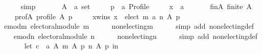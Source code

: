 \begin{isabellebody}
\ \ \ \ \isamarkupfalse%
\ simp\isanewline
{}\isamarkupfalse%
\isanewline
\ \ \isamarkupfalse%
\isanewline
\ \ \ \ A\ {\isacharcolon}{\kern0pt}{\isacharcolon}{\kern0pt}\ {\isachardoublequoteopen}{\isacharprime}{\kern0pt}a\ set{\isachardoublequoteclose}\ \isanewline
\ \ \ \ p\ {\isacharcolon}{\kern0pt}{\isacharcolon}{\kern0pt}\ {\isachardoublequoteopen}{\isacharprime}{\kern0pt}a\ Profile{\isachardoublequoteclose}\ \isanewline
\ \ \ \ x\ {\isacharcolon}{\kern0pt}{\isacharcolon}{\kern0pt}\ {\isachardoublequoteopen}{\isacharprime}{\kern0pt}a{\isachardoublequoteclose}\isanewline
\ \ \isamarkupfalse%
\isanewline
\ \ \ \ fin{\isacharunderscore}{\kern0pt}A{\isacharcolon}{\kern0pt}\ {\isachardoublequoteopen}finite\ A{\isachardoublequoteclose}\ \isanewline
\ \ \ \ prof{\isacharunderscore}{\kern0pt}A{\isacharcolon}{\kern0pt}\ {\isachardoublequoteopen}profile\ A\ p{\isachardoublequoteclose}\ \isanewline
\ \ \ \ x{\isacharunderscore}{\kern0pt}wins{\isacharcolon}{\kern0pt}\ {\isachardoublequoteopen}x\ {\isasymin}\ elect\ {\isacharparenleft}{\kern0pt}m\ {\isasymparallel}\isactrlsub a\ n{\isacharparenright}{\kern0pt}\ A\ p{\isachardoublequoteclose}\isanewline
\ \ \isamarkupfalse%
\ emod{\isacharunderscore}{\kern0pt}m{\isacharcolon}{\kern0pt}\ {\isachardoublequoteopen}electoral{\isacharunderscore}{\kern0pt}module\ m{\isachardoublequoteclose}\isanewline
\ \ \ \ \isamarkupfalse%
\ non{\isacharunderscore}{\kern0pt}electing{\isacharunderscore}{\kern0pt}m\isanewline
\ \ \ \ \isamarkupfalse%
\ {\isacharparenleft}{\kern0pt}simp\ add{\isacharcolon}{\kern0pt}\ non{\isacharunderscore}{\kern0pt}electing{\isacharunderscore}{\kern0pt}def{\isacharparenright}{\kern0pt}\isanewline
\ \ \isamarkupfalse%
\ emod{\isacharunderscore}{\kern0pt}n{\isacharcolon}{\kern0pt}\ {\isachardoublequoteopen}electoral{\isacharunderscore}{\kern0pt}module\ n{\isachardoublequoteclose}\isanewline
\ \ \ \ \isamarkupfalse%
\ non{\isacharunderscore}{\kern0pt}electing{\isacharunderscore}{\kern0pt}n\isanewline
\ \ \ \ \isamarkupfalse%
\ {\isacharparenleft}{\kern0pt}simp\ add{\isacharcolon}{\kern0pt}\ non{\isacharunderscore}{\kern0pt}electing{\isacharunderscore}{\kern0pt}def{\isacharparenright}{\kern0pt}\isanewline
\ \ \isamarkupfalse%
\isanewline
\ \ \ \ {\isachardoublequoteopen}let\ c\ {\isacharequal}{\kern0pt}\ {\isacharparenleft}{\kern0pt}a\ A\ {\isacharparenleft}{\kern0pt}m\ A\ p{\isacharparenright}{\kern0pt}\ {\isacharparenleft}{\kern0pt}n\ A\ p{\isacharparenright}{\kern0pt}{\isacharparenright}{\kern0pt}\ in\isanewline

\end{isabellebody}
